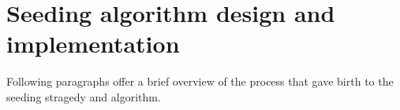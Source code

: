\chapter{Seeding algorithm design and implementation}

Following paragraphs offer a brief overview of the process that gave birth to the seeding stragedy and algorithm.